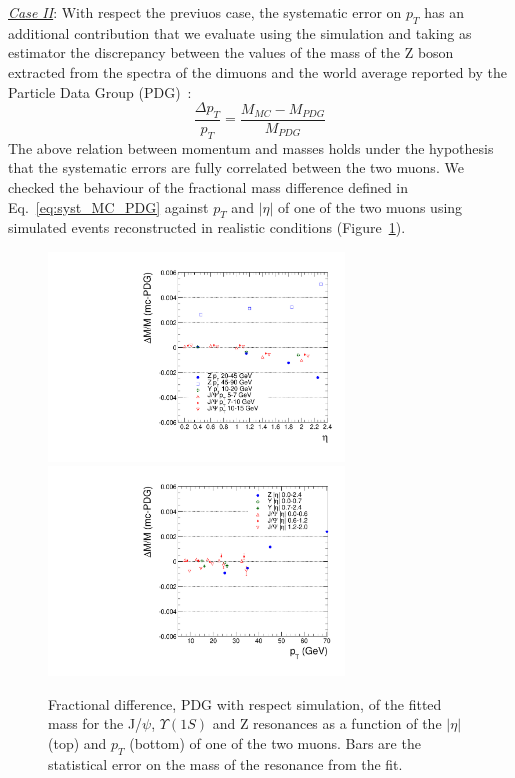 \underline{\sl Case II}: With respect the previuos case, the
systematic error on $p_T$ has an additional contribution that we
evaluate using the simulation and taking as estimator the discrepancy
between the values of the mass of the Z boson extracted from the
spectra of the dimuons and the world average reported by the Particle
Data Group (PDG)~\cite{Beringer:1900zz}: 
\begin{equation}
  \frac{\Delta p_T}{p_T}=\frac{M_{MC}-M_{PDG}}{M_{PDG}}
  \label{eq:syst_MC_PDG}
\end{equation}
The above relation between momentum
and masses holds under the hypothesis that the systematic errors are fully correlated between the two muons. 
We checked the behaviour of the fractional mass difference defined
in Eq.~\ref{eq:syst_MC_PDG} against $p_T$ and $|\eta|$ of one of the two
muons using simulated events reconstructed in realistic conditions
(Figure~\ref{fig:ScalePDGMC_8TeV}). 
\begin{figure}[hbtp]  
\begin{center}
\includegraphics[width=0.7\textwidth]{figures/H4l_Style/2012_22Jan2013ReReco/ScalePdg_mc_Eta_afterCorrection_V2}
\includegraphics[width=0.7\textwidth]{figures/H4l_Style/2012_22Jan2013ReReco/ScalePdg_mc_Pt_afterCorrection_V2} 
 \hspace{1cm} 
   \caption{Fractional difference, PDG with respect simulation, of the fitted mass for the J/$\psi$,
     $\Upsilon(1S)$ and Z resonances as a function of the $|\eta|$ (top)
     and $p_T$ (bottom) of one of the two muons. Bars are the
     statistical error on the mass of the resonance from the fit.
   \label{fig:ScalePDGMC_8TeV}}
 \end{center}
\end{figure} 
